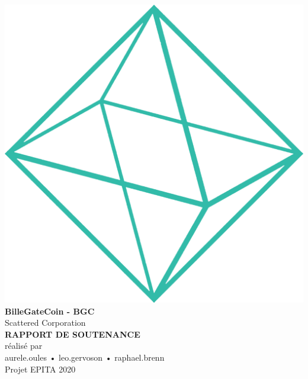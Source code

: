 \documentclass{article}
\begin{document}
\makeatletter
    \begin{titlepage}
        \begin{center}
            \includegraphics[width=0.5\linewidth]{assets/shape.png}\\[10ex]
            {\huge \bfseries BilleGateCoin - BGC}\\[2ex] 
            {\LARGE Scattered Corporation}\\[10ex]
            
            {\huge \bfseries RAPPORT DE SOUTENANCE}\\[5ex]
            \large{réalisé par\\[2ex]aurele.oules  •  leo.gervoson  •  raphael.brenn}\\[16ex] 
            {\large Projet EPITA 2020}
        \end{center}
    \end{titlepage}
\makeatother
\thispagestyle{empty}

\newpage
\begin{center}
\tableofcontents
\end{center}
\newpage
\pagecolor{white}
\sectionfont{\color{greendark}}  %

\fancyhf{}
\renewcommand{\headrulewidth}{0pt}
\renewcommand{\footrulewidth}{1pt}
\newcommand\bold[1]{\textcolor{green}{\bfseries{#1}}}
\newcommand\boldblack[1]{\textcolor{background}{\bfseries{#1}}}
\renewcommand{\footrule}{\hbox to\headwidth{\color{green}\leaders\hrule height \footrulewidth\hfill}}

\rfoot{\thepage}
\pagestyle{fancy}
\renewcommand\seriesdefault{l}
\end{document}
